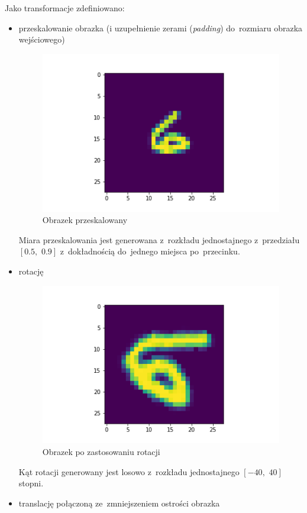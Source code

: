 \documentclass[11pt, a4paper]{article}
\begin{document}
\begin{enumerate}
Jako transformacje zdefiniowano: 
\begin{itemize}
 \item przeskalowanie obrazka (i uzupełnienie zerami (\textit{padding}) do~rozmiaru obrazka wejściowego) \\
 \begin{figure}[H]
  \centering
  \includegraphics[scale=0.6]{rescaled.png}
  \caption{Obrazek przeskalowany}
 \end{figure}
 Miara przeskalowania jest generowana z~rozkładu jednostajnego z~przedziału $[0.5,\,\, 0.9]$ z~dokładnością do~jednego miejsca po~przecinku.
 \item rotację \\
 \begin{figure}[H]
  \centering
  \includegraphics[scale=0.6]{rotated.png}
  \caption{Obrazek po zastosowaniu rotacji}
 \end{figure}
 Kąt rotacji generowany jest losowo z~rozkładu jednostajnego $[-40,\,\, 40]$ stopni.
 \item translację połączoną ze~zmniejszeniem ostrości obrazka \\

\end{itemize}
\end{enumerate}
\end{document}
